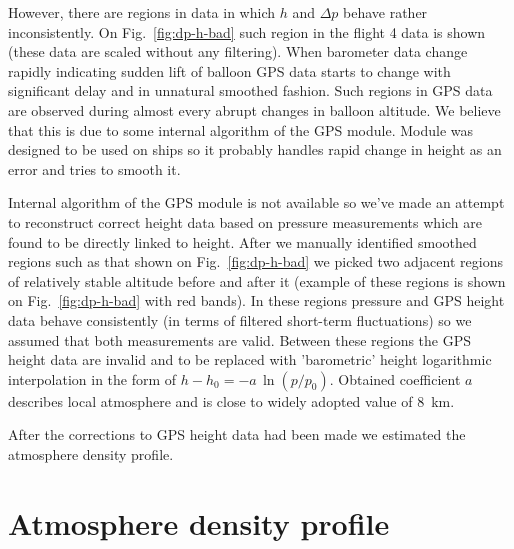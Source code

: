\documentclass[final,5p,times,twocolumn]{elsarticle}
\begin{document}
However, there are regions in data in which $h$ and $\Delta p$ behave rather inconsistently. On Fig.~\ref{fig:dp-h-bad} such region in the flight 4 data is shown (these data are scaled without any filtering). When barometer data change rapidly indicating sudden lift of balloon GPS data starts to change with significant delay and in unnatural smoothed fashion. Such regions in GPS data are observed during almost every abrupt changes in balloon altitude. We believe that this is due to some internal algorithm of the GPS module. Module was designed to be used on ships so it probably handles rapid change in height as an error and tries to smooth it.

Internal algorithm of the GPS module is not available so we've made an attempt to reconstruct correct height data based on pressure measurements which are found to be directly linked to height. After we manually identified smoothed regions such as that shown on Fig.~\ref{fig:dp-h-bad} we picked two adjacent regions of relatively stable altitude before and after it (example of these regions is shown on Fig.~\ref{fig:dp-h-bad} with red bands). In these regions pressure and GPS height data behave consistently (in terms of filtered short-term fluctuations) so we assumed that both measurements are valid. Between these regions the GPS height data are invalid and to be replaced with 'barometric' height logarithmic interpolation in the form of $h-h_0 = - a \, \ln(p/p_0)$. Obtained coefficient $a$ describes local atmosphere and is close to widely adopted value of $8$~km.

After the corrections to GPS height data had been made we estimated the atmosphere density profile. 

\section{Atmosphere density profile\label{sect:atmosphere-profile}}
\end{document}
